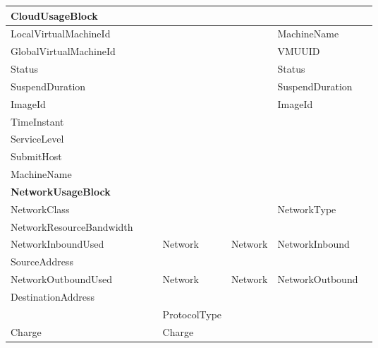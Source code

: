 \begin{longtable}{ | p{} | p{} | p{} | p{} | p{} | p{} | p{} | }
\textbf{Cloud\-Usage\-Block}& 			& 			&			& 			& 						& \\ \hline
Local\-Virtual\-Machine\-Id& 			& 			&			& 			& Machine\-Name					& \\ \hline
Global\-Virtual\-Machine\-Id& 			& 			&			& 			& VMUUID					& \\ \hline
Status			& 			& 			&			& 			& Status					& \\ \hline
Suspend\-Duration	& 			& 			&			& 			& Suspend\-Duration				& \\ \hline
ImageId			& 			& 			&			& 			& ImageId					& \\ \hline
TimeInstant		& 			& 			&			& 			& 						& \\ \hline
ServiceLevel		& 			& 			&			& 			& 						& \\ \hline
SubmitHost		& 			& 			&			& 			& 						& \\ \hline
Machine\-Name		& 			& 			&			& 			& 						& \\ \hline\hline






\textbf{\-Network\-Usage\-Block}& 		& 			&			& 			& 									& \\ \hline
Network\-Class			& 		& 			&			& 			& Network\-Type					& \\ \hline
Network\-Resource\-Bandwidth	&		&			&			&			&						& \\ \hline
Network\-Inbound\-Used		& 		& 			& Network		& Network		& Network\-Inbound				& \\ \hline
Source\-Address			& 		& 			& 			& 			& 						& \\ \hline
Network\-Outbound\-Used		& 		& 			& Network		& Network		& Network\-Outbound				& \\ \hline
Destination\-Address		& 		& 			& 			& 			& 						& \\ \hline
				& 		& 			& Protocol\-Type	& 			&					& \\ \hline
Charge				& 		& 			& Charge		& 			& 						& \\ \hline			
\end{longtable}
\normalsize


